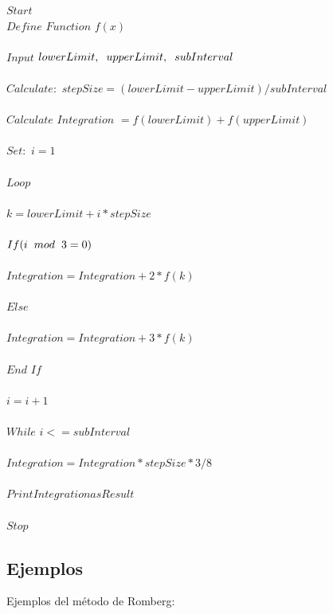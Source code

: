 \documentclass[journal,transmag]{IEEEtran}
\theoremstyle{mytheoremstyle}
\theoremstyle{mytheoremstyle}
\theoremstyle{myproblemstyle}
\begin{document}
        $Start$ \\
        $Define$ $Function$ $f(x)$ \\ \\
        $Input$ $lowerLimit, \hspace{0.2cm} upperLimit, \hspace{0.2cm} subInterval$ \\ \\
        $Calculate:$ $stepSize = (lowerLimit - upperLimit)/subInterval$ \\ \\
        $Calculate$ $Integration$ $= f(lowerLimit) + f(upperLimit)$ \\ \\
        $Set:$ $i = 1$ \\ \\
        $Loop$ \\ \\
            $k = lowerLimit + i * stepSize$ \\ \\
            $If (i \hspace{0.2cm} mod \hspace{0.2cm} 3 = 0)$ \\ \\
                $Integration = Integration + 2 * f(k)$ \\ \\
            $Else$ \\ \\
                $Integration = Integration + 3 * f(k)$ \\ \\
            $End$ $If$ \\ \\
            $i = i + 1$ \\ \\
        $While$ $i < = subInterval$ \\ \\
        $Integration = Integration * stepSize * 3/8$ \\ \\
        $Print Integration as Result$ \\ \\
        $Stop$ \\ 

    \subsection{Ejemplos}
        Ejemplos del método de Romberg: \cite{chapra_method_2007}
\end{document}
